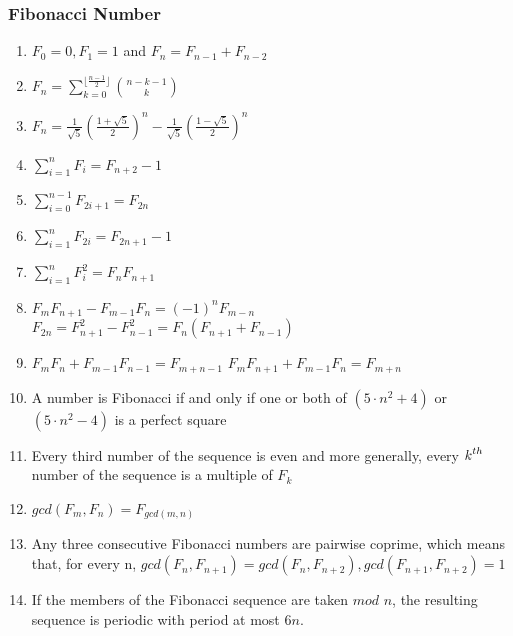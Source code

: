 \subsubsection{Fibonacci Number}\begin{enumerate}

            
            \item $\displaystyle F_0=0, F_1=1$ and $\displaystyle F_n=F_{n-1}+F_{n-2}$
            \item $\displaystyle F_n=\sum\limits_{k=0}^{\lfloor\frac{n-1}{2}\rfloor}\binom{n-k-1}{k}$
            \item $\displaystyle
                F_n=\frac{1}{\sqrt{5}}(\frac{1+\sqrt{5}}{2})^n-\frac{1}{\sqrt{5}}(\frac{1-\sqrt{5}}{2})^n$
            
            \item $\displaystyle \sum\limits_{i=1}^{n}F_i=F_{n+2}-1$
            \item $\displaystyle \sum\limits_{i=0}^{n-1}F_{2i+1}=F_{2n}$
            \item $\displaystyle \sum\limits_{i=1}^{n}F_{2i}=F_{2n+1}-1$
            \item $\displaystyle \sum\limits_{i=1}^{n}F_{i}^{2}=F_nF_{n+1}$
            \item $\displaystyle F_mF_{n+1}-F_{m-1}F_{n}=(-1)^nF_{m-n}$
                $\displaystyle F_{2n}=F_{n+1}^2-F_{n-1}^2=F_n(F_{n+1}+F_{n-1})$
            \item $\displaystyle F_mF_n+F_{m-1}F_{n-1}=F_{m+n-1}$
                $\displaystyle F_mF_{n+1}+F_{m-1}F_{n}=F_{m+n}$
            \item A number is Fibonacci if and only if one or both of $\displaystyle (5 \cdot n^2 + 4)$ or $\displaystyle
                (5
                \cdot
                n^2 - 4)$ is a perfect square
            \item Every third number of the sequence is even and more generally, every $\displaystyle \displaystyle
                k^{th}$
                number
                of the sequence is a multiple of $\displaystyle F_k$
            \item $gcd(F_m, F_n)=F_{gcd(m, n)}$
            \item Any three consecutive Fibonacci numbers are pairwise coprime, which means that, for every n, $gcd(F_n,
                F_{n+1})=gcd(F_n, F_{n+2}), gcd(F_{n+1}, F_{n+2})=1$
            \item 
                If the members of the Fibonacci sequence are taken $mod$ $n$, the resulting sequence is periodic with
                    period
                    at most $6n$.

                \end{enumerate}
